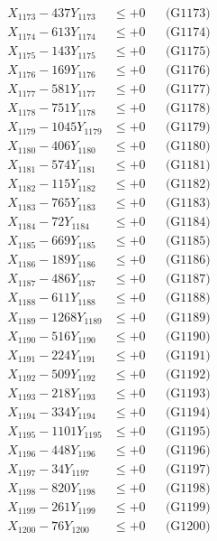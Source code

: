 \documentclass[a4paper,10pt]{article}
\begin{document}
{\begin{align}
X_{1173} - 437Y_{1173} &\leq +0 && \text{(G1173)} \\
X_{1174} - 613Y_{1174} &\leq +0 && \text{(G1174)} \\
X_{1175} - 143Y_{1175} &\leq +0 && \text{(G1175)} \\
X_{1176} - 169Y_{1176} &\leq +0 && \text{(G1176)} \\
X_{1177} - 581Y_{1177} &\leq +0 && \text{(G1177)} \\
X_{1178} - 751Y_{1178} &\leq +0 && \text{(G1178)} \\
X_{1179} - 1045Y_{1179} &\leq +0 && \text{(G1179)} \\
X_{1180} - 406Y_{1180} &\leq +0 && \text{(G1180)} \\
\allowbreak
X_{1181} - 574Y_{1181} &\leq +0 && \text{(G1181)} \\
X_{1182} - 115Y_{1182} &\leq +0 && \text{(G1182)} \\
X_{1183} - 765Y_{1183} &\leq +0 && \text{(G1183)} \\
X_{1184} - 72Y_{1184} &\leq +0 && \text{(G1184)} \\
X_{1185} - 669Y_{1185} &\leq +0 && \text{(G1185)} \\
X_{1186} - 189Y_{1186} &\leq +0 && \text{(G1186)} \\
X_{1187} - 486Y_{1187} &\leq +0 && \text{(G1187)} \\
X_{1188} - 611Y_{1188} &\leq +0 && \text{(G1188)} \\
X_{1189} - 1268Y_{1189} &\leq +0 && \text{(G1189)} \\
X_{1190} - 516Y_{1190} &\leq +0 && \text{(G1190)} \\
\allowbreak
X_{1191} - 224Y_{1191} &\leq +0 && \text{(G1191)} \\
X_{1192} - 509Y_{1192} &\leq +0 && \text{(G1192)} \\
X_{1193} - 218Y_{1193} &\leq +0 && \text{(G1193)} \\
X_{1194} - 334Y_{1194} &\leq +0 && \text{(G1194)} \\
X_{1195} - 1101Y_{1195} &\leq +0 && \text{(G1195)} \\
X_{1196} - 448Y_{1196} &\leq +0 && \text{(G1196)} \\
X_{1197} - 34Y_{1197} &\leq +0 && \text{(G1197)} \\
X_{1198} - 820Y_{1198} &\leq +0 && \text{(G1198)} \\
X_{1199} - 261Y_{1199} &\leq +0 && \text{(G1199)} \\
X_{1200} - 76Y_{1200} &\leq +0 && \text{(G1200)} \\

\end{align}}
\end{document}

